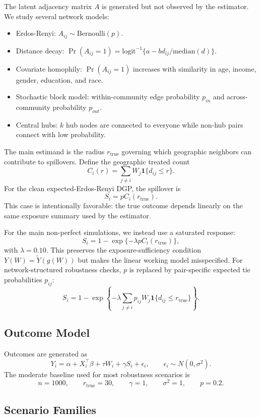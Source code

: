 \documentclass[11pt]{article}
\begin{document}
The latent adjacency matrix $A$ is generated but not observed by the estimator. We study several network models:
\begin{itemize}[leftmargin=1.25em]
    \item Erdos-Renyi: $A_{ij}\sim \text{Bernoulli}(p)$.
    \item Distance decay: $\Pr(A_{ij}=1)=\text{logit}^{-1}\{a-bd_{ij}/\text{median}(d)\}$.
    \item Covariate homophily: $\Pr(A_{ij}=1)$ increases with similarity in age, income, gender, education, and race.
    \item Stochastic block model: within-community edge probability $p_{in}$ and across-community probability $p_{out}$.
    \item Central hubs: $k$ hub nodes are connected to everyone while non-hub pairs connect with low probability.
\end{itemize}

The main estimand is the radius $r_{\text{true}}$ governing which geographic neighbors can contribute to spillovers. Define the geographic treated count
\[
C_i(r)=\sum_{j\neq i} W_j\mathbf{1}\{d_{ij}\le r\}.
\]
For the clean expected-Erdos-Renyi DGP, the spillover is
\[
S_i=pC_i(r_{\text{true}}).
\]
This case is intentionally favorable: the true outcome depends linearly on the same exposure summary used by the estimator.

For the main non-perfect simulations, we instead use a saturated response:
\[
S_i=1-\exp\{-\lambda p C_i(r_{\text{true}})\},
\]
with $\lambda=0.10$. This preserves the exposure-sufficiency condition $Y(W)=\widetilde{Y}(g(W))$ but makes the linear working model misspecified. For network-structured robustness checks, $p$ is replaced by pair-specific expected tie probabilities $p_{ij}$:
\[
S_i=1-\exp\left\{-\lambda\sum_{j\neq i}p_{ij}W_j\mathbf{1}\{d_{ij}\le r_{\text{true}}\}\right\}.
\]

\subsection{Outcome Model}

Outcomes are generated as
\[
Y_i=\alpha+X_i^\top\beta+\tau W_i+\gamma S_i+\epsilon_i,
\qquad
\epsilon_i\sim N(0,\sigma^2).
\]
The moderate baseline used for most robustness scenarios is
\[
n=1000,\qquad r_{\text{true}}=30,\qquad \gamma=1,\qquad \sigma^2=1,\qquad p=0.2.
\]

\subsection{Scenario Families}
\end{document}
